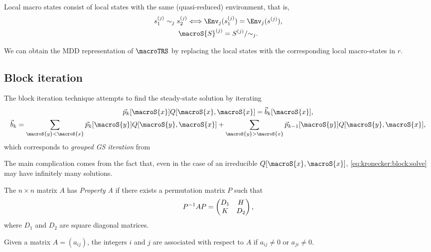 Local macro states consist of local states with the same
(quasi-reduced) environment, that is,
\begin{gather}
  s^{(j)}_1 \sim_j s^{(j)}_2 \Longleftrightarrow \Env_j(s^{(j)}_1) =
  \Env_j(s^{(j)}) \text, \\
  \macroS{S}^{(j)} = S^{(j)} / {\sim}_j \text.
\end{gather}

We can obtain the MDD representation of $\macroTRS$ by replacing the
local states with the corresponding local macro-states in $r$.

\subsection{Block iteration}

The block iteration technique \citep{DBLP:journals/tse/Buchholz99}
attempts to find the steady-state solution by iterating
\begin{gather}
  \vec{p}_k[\macroS{x}] Q[\macroS{x}, \macroS{x}] =
  \vec{b}_k[\macroS{x}] \text, \label{eq:kronecker:block:solve} \\
  \vec{b}_k = \sum_{\macroS{y} < \macroS{x}} \vec{p}_k[\macroS{y}]
  Q[\macroS{y}, \macroS{x}] + \sum_{\macroS{y} > \macroS{x}}
  \vec{p}_{k - 1}[\macroS{y}] Q[\macroS{y}, \macroS{x}] \text,
\end{gather}
which corresponds to \emph{grouped GS iteration} from 

The main complication comes from the fact that, even in the case of an
irreducible $Q[\macroS{x}, \macroS{x}]$,
\eqref{eq:kronecker:block:solve} may have infinitely many solutions.

\begin{dfn}
  The $n \times n$ matrix $A$ has \emph{Property A} if there exists a
  permutation matrix $P$ such that
  \begin{align}
    P^{-1} A P = \begin{pmatrix}
      D_1 & H \\ K & D_2
    \end{pmatrix} \text,
  \end{align}
  where $D_1$ and $D_2$ are square diagonal matrices.
\end{dfn}

\begin{dfn}
  Given a matrix $A = (a_{ij})$, the integers $i$ and $j$ are
  associated with respect to $A$ if $a_{ij} \ne 0$ or $a_{ji} \ne 0$.
\end{dfn}

